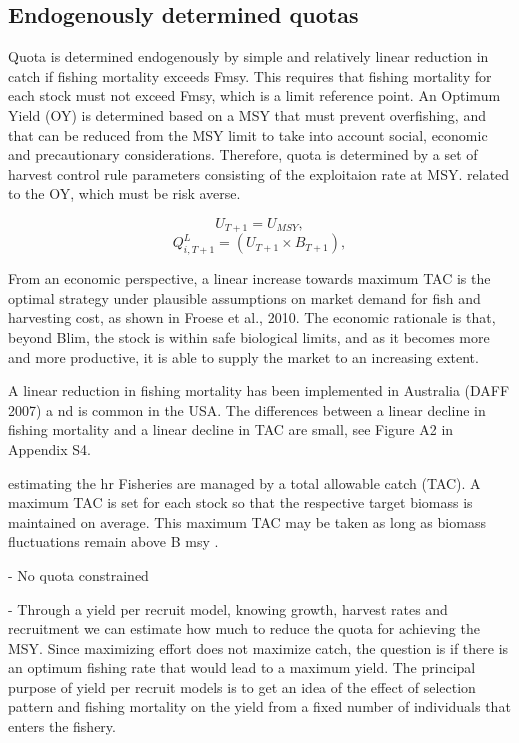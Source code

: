 \documentclass[12pt,oneline,a4paper,numbib]{ouparticle}
\begin{document}
\subsection{Endogenously determined quotas}
\label{sec2.3}

Quota is determined endogenously by simple and relatively linear reduction in catch if fishing mortality exceeds Fmsy. This requires that fishing mortality for each stock must not exceed Fmsy, which is a limit reference point. An Optimum Yield (OY) is determined based on a MSY that must prevent overfishing, and that can be reduced from the MSY limit to take into account social, economic and precautionary considerations.  Therefore, quota is determined by a set of harvest control rule parameters consisting of the exploitaion rate at MSY.
related to the OY, which must be risk averse. 

\begin{equation*}
 U_{T+1} = U_{MSY}, 
\end{equation*}
\begin{equation*}
 Q_{i, T+1}^{L} = (U_{T+1}\times B_{T+1}),
\end{equation*}



From an economic perspective, a linear increase towards maximum TAC is the optimal strategy under plausible assumptions on market demand for fish and harvesting cost, as shown in Froese et al., 2010. The economic rationale is that, beyond Blim, the stock is within safe biological limits, and as it becomes more and more productive, it is able to supply the market to an increasing extent. 

A linear reduction in fishing mortality has been
implemented in Australia (DAFF 2007) a
nd is common in the USA. The differences between
a linear decline in fishing mortality and a linear decline in TAC are small, see Figure A2 in
Appendix S4.     

estimating the hr Fisheries are managed by a total allowable catch (TAC). A
maximum TAC is set for each stock so that the respective target biomass is maintained
on average. This maximum TAC may be taken as long as biomass fluctuations remain
above 
B
msy
. 

- No quota constrained

- Through a yield per recruit model, knowing growth, harvest rates and recruitment we can estimate how much to reduce the quota for achieving the MSY.  Since maximizing effort does not maximize catch, the question is if there is an optimum fishing rate that would lead to a maximum yield. The principal purpose of yield per recruit models is to get an idea of the effect of selection pattern and fishing mortality on the yield from a fixed number of individuals that enters the fishery.
\end{document}
